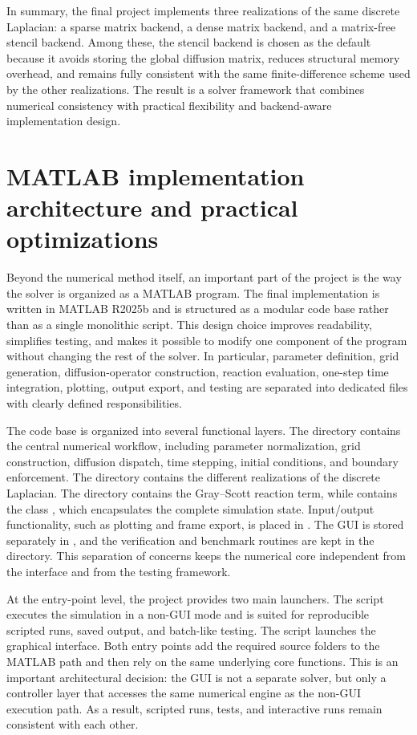 In summary, the final project implements three realizations of the same discrete Laplacian: a sparse matrix backend, a dense matrix backend, and a matrix-free stencil backend. Among these, the stencil backend is chosen as the default because it avoids storing the global diffusion matrix, reduces structural memory overhead, and remains fully consistent with the same finite-difference scheme used by the other realizations. The result is a solver framework that combines numerical consistency with practical flexibility and backend-aware implementation design.

\section{MATLAB implementation architecture and practical optimizations}
\label{sec:numimpl_architecture_optimizations}

Beyond the numerical method itself, an important part of the project is the way the solver is organized as a MATLAB program. The final implementation is written in MATLAB R2025b and is structured as a modular code base rather than as a single monolithic script. This design choice improves readability, simplifies testing, and makes it possible to modify one component of the program without changing the rest of the solver. In particular, parameter definition, grid generation, diffusion-operator construction, reaction evaluation, one-step time integration, plotting, output export, and testing are separated into dedicated files with clearly defined responsibilities.

The code base is organized into several functional layers. The directory  contains the central numerical workflow, including parameter normalization, grid construction, diffusion dispatch, time stepping, initial conditions, and boundary enforcement. The directory  contains the different realizations of the discrete Laplacian. The directory  contains the Gray--Scott reaction term, while  contains the class , which encapsulates the complete simulation state. Input/output functionality, such as plotting and frame export, is placed in . The GUI is stored separately in , and the verification and benchmark routines are kept in the  directory. This separation of concerns keeps the numerical core independent from the interface and from the testing framework.

At the entry-point level, the project provides two main launchers. The script  executes the simulation in a non-GUI mode and is suited for reproducible scripted runs, saved output, and batch-like testing. The script  launches the graphical interface. Both entry points add the required source folders to the MATLAB path and then rely on the same underlying core functions. This is an important architectural decision: the GUI is not a separate solver, but only a controller layer that accesses the same numerical engine as the non-GUI execution path. As a result, scripted runs, tests, and interactive runs remain consistent with each other.


